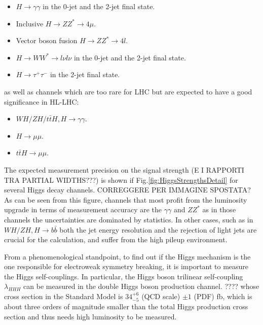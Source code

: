\documentclass[a4paper,twoside,12pt]{article}
\begin{document}
\begin{itemize}
\item $H \rightarrow \gamma\gamma$ in the 0-jet and the 2-jet final state.
\item Inclusive $H \rightarrow ZZ^{*} \rightarrow 4\mu$.
\item Vector boson fusion $H \rightarrow ZZ^{*} \rightarrow 4l$.
\item $H \rightarrow WW^* \rightarrow l\nu l\nu$ in the 0-jet and the 2-jet final state.
\item $H \rightarrow \tau^+\tau^-$ in the 2-jet final state.
\end{itemize}

as well as channels which are too rare for LHC but are expected to have a good significance
in HL-LHC:
\begin{itemize}
\item $WH/ZH/t\bar{t}H, H \rightarrow \gamma\gamma$.
\item $H \rightarrow \mu\mu$.
\item $t\bar{t}H \rightarrow \mu\mu$.
\end{itemize}

The expected measurement precision on the signal strength (E I RAPPORTI TRA PARTIAL WIDTHS???) is shown if Fig.\ref{fig:HiggsStrengthsDetail} for several Higgs decay channels. CORREGGERE PER IMMAGINE SPOSTATA?\\



As can be seen from this figure, channels that most profit from the
luminosity upgrade in terms of measurement accuracy are the $\gamma\gamma$ and $ZZ^*$
as in those channels the uncertainties are dominated by statistics. In other cases, such as in $WH/ZH, H \rightarrow b\bar{b}$ both the jet
energy resolution and the rejection of light jets are crucial for the calculation, and suffer from
the high pileup environment. \\



\bigskip
\bigskip
\bigskip


From a phenomenological standpoint, to find out if the Higgs mechanism is the one responsible
for electroweak symmetry breaking, it is important to measure the Higgs self-couplings.
In particular, the Higgs boson trilinear self-coupling $\lambda_{HHH}$ can be measured
in the double Higgs boson production channel. ???? whose cross section in the Standard Model is
$34^{+6}_{-5}$ (QCD scale) $\pm 1$ (PDF) fb, which is about three orders of magnitude
smaller than the total Higgs production cross section and thus needs high
luminosity to be measured. \\
\end{document}
